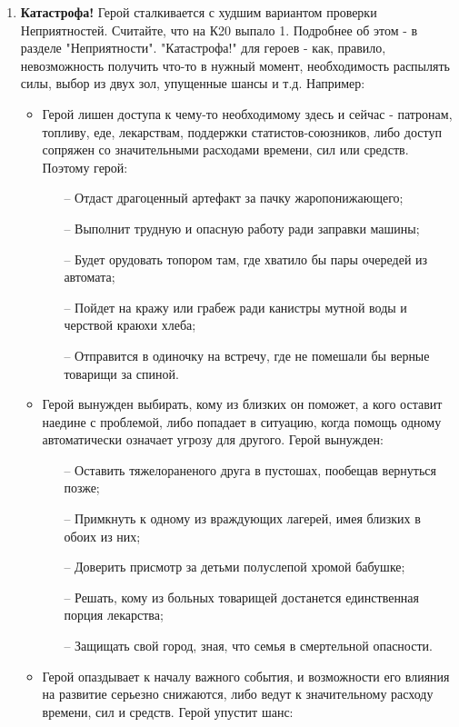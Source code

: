 \begin{enumerate}
    \item \textbf{Катастрофа!}
    \newline Герой сталкивается с худшим вариантом проверки Неприятностей. Считайте, что на К20 выпало 1. Подробнее об этом - в разделе "Неприятности".
    \newline "Катастрофа!" для героев - как, правило, невозможность получить что-то в нужный момент, необходимость распылять силы, выбор из двух зол, упущенные шансы и т.д. Например:
    \begin{itemize}
        \item Герой лишен доступа к чему-то необходимому здесь и сейчас - патронам, топливу, еде, лекарствам, поддержки статистов-союзников, либо доступ сопряжен со значительными расходами времени, сил или средств. Поэтому герой:
        \begin{itemize}
	        \item[--] Отдаст драгоценный артефакт за пачку жаропонижающего;
	        \item[--] Выполнит трудную и опасную работу ради заправки машины;
	        \item[--] Будет орудовать топором там, где хватило бы пары очередей из автомата;
	        \item[--] Пойдет на кражу или грабеж ради канистры мутной воды и черствой краюхи хлеба;
	        \item[--] Отправится в одиночку на встречу, где не помешали бы верные товарищи за спиной.
        \end{itemize}
        \item Герой вынужден выбирать, кому из близких он поможет, а кого оставит наедине с проблемой, либо попадает в ситуацию, когда помощь одному автоматически означает угрозу для другого. Герой вынужден:
        \begin{itemize}
	        \item[--] Оставить тяжелораненого друга в пустошах, пообещав вернуться позже;
	        \item[--] Примкнуть к одному из враждующих лагерей, имея близких в обоих из них;
	        \item[--] Доверить присмотр за детьми полуслепой хромой бабушке;
	        \item[--] Решать, кому из больных товарищей достанется единственная порция лекарства;
	        \item[--] Защищать свой город, зная, что семья в смертельной опасности.
        \end{itemize}
        \item Герой опаздывает к началу важного события, и возможности его влияния на развитие серьезно снижаются, либо ведут к значительному расходу времени, сил и средств. Герой упустит шанс:

\end{itemize}
\end{enumerate}
